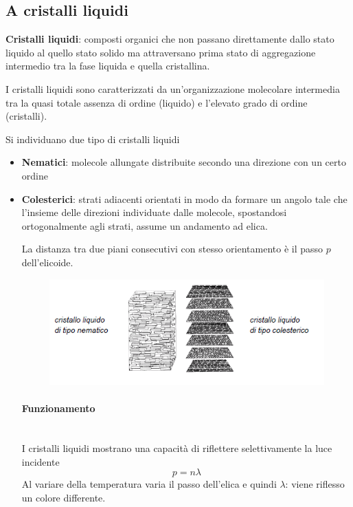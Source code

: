 \documentclass[a4paper, 15pt]{article}
\begin{document}
\subsection{A cristalli liquidi}
\begin{adjustwidth}{2in}{}	
	\textbf{Cristalli liquidi}: composti organici che non passano direttamente dallo stato liquido al quello stato solido ma attraversano prima stato di aggregazione intermedio tra la fase liquida e quella cristallina. \newline 
	
	I cristalli liquidi sono caratterizzati da un'organizzazione molecolare intermedia tra la quasi totale assenza di ordine (liquido) e l'elevato grado di ordine (cristalli). \newline 
	
	Si individuano due tipo di cristalli liquidi
	\begin{itemize}
		\item \textbf{Nematici}: molecole allungate distribuite secondo una direzione con un certo ordine
		
		\item \textbf{Colesterici}: strati adiacenti orientati in modo
		da formare un angolo tale che l'insieme delle direzioni individuate dalle molecole, spostandosi ortogonalmente agli strati, assume un andamento ad elica. 
		
		La distanza tra due piani consecutivi con stesso orientamento è il passo $p$ dell'elicoide.		
		\begin{figure}[H]
			\centering
			\includegraphics[width=0.5\linewidth]{immagini/screenshot037}
			\label{fig:screenshot037}
		\end{figure}
		
		\paragraph{Funzionamento} \mbox{} \\
		I cristalli liquidi mostrano una capacità di riflettere selettivamente la luce incidente
		\[p=n\lambda\]
		Al variare della temperatura varia il passo dell'elica e quindi $\lambda$: viene riflesso un colore differente. \newline
		

\end{itemize}
\end{adjustwidth}
\end{document}
